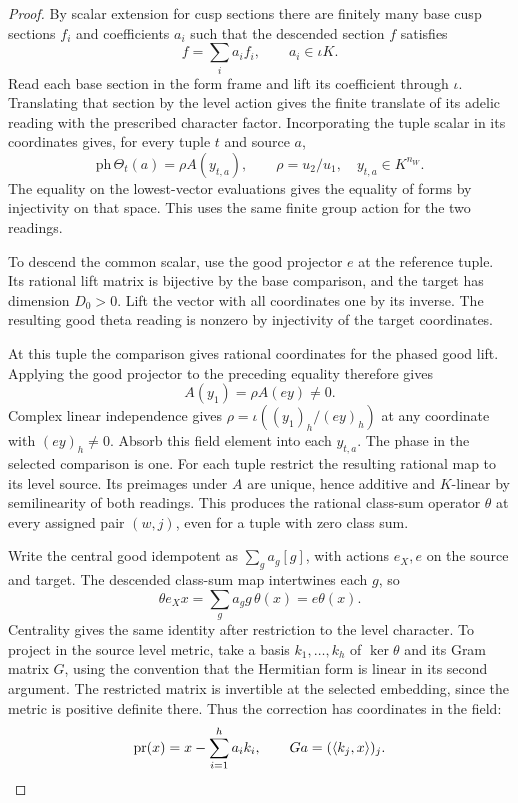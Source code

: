 \begin{proof}
By scalar extension for cusp sections there are finitely many base cusp sections \(f_i\) and coefficients \(a_i\) such that the descended section \(f\) satisfies
\[
 f=\sum_i a_i f_i,\qquad a_i\in\iota K .
\] Read each
base section in the form frame and lift its coefficient
through \(\iota\). Translating that section by the level action
gives the finite translate of its adelic reading with the
prescribed character factor. Incorporating the tuple scalar in its
coordinates gives, for every tuple \(t\) and source \(a\),
\[
       \mathrm{ph}\,\Theta_t(a)=\rho A(y_{t,a}),\qquad
       \rho=u_2/u_1,\quad y_{t,a}\in K^{n_W}.
\]
The equality on the lowest-vector evaluations gives the equality
of forms by injectivity on that space. This uses the same
finite group action for the two readings.
\label{cor:joint-family-estimate-4}

To descend the common scalar, use the good projector \(e\) at
the reference tuple. Its rational lift matrix is bijective by
the base comparison, and the target has dimension \(D_0>0\).
Lift the vector with all coordinates one by its inverse. The
resulting good theta reading is nonzero by injectivity of the
target coordinates.

At this tuple the comparison gives rational
coordinates for the phased good lift. Applying the good projector
to the preceding equality therefore gives
\[
           A(y_1)=\rho A(e y)\ne0.
\]
Complex linear independence gives
\(\rho=\iota((y_1)_h/(e y)_h)\) at any coordinate with
\((e y)_h\ne0\). Absorb this field element into each
\(y_{t,a}\). The phase in the selected comparison is one.
For each tuple restrict the resulting rational map to its level
source. Its preimages under \(A\) are unique, hence additive
and \(K\)-linear by semilinearity of both readings. This
produces the rational class-sum operator \(\theta\) at every
assigned pair \((w,j)\), even for a tuple with zero class sum.

Write the central good idempotent as \(\sum_g a_g[g]\), with
actions \(e_X,e\) on the source and target. The descended
class-sum map intertwines each \(g\), so
\[
     \theta e_Xx=\sum_g a_g g\,\theta(x)=e\theta(x).
\]
Centrality gives the same identity after restriction to the level
character. To project in the source level metric, take a basis
\(k_1,\ldots,k_h\) of \(\ker\theta\) and its Gram matrix \(G\),
using the convention that the Hermitian form is linear in its
second argument. The restricted matrix is invertible at the
selected embedding, since the metric is positive definite there.
Thus the correction has coordinates in the field:
\[
        {\rm pr}(x)=x-\sum_{i=1}^h a_i k_i,\qquad
        Ga=(\langle k_j,x\rangle)_j .
\]


\end{proof}
